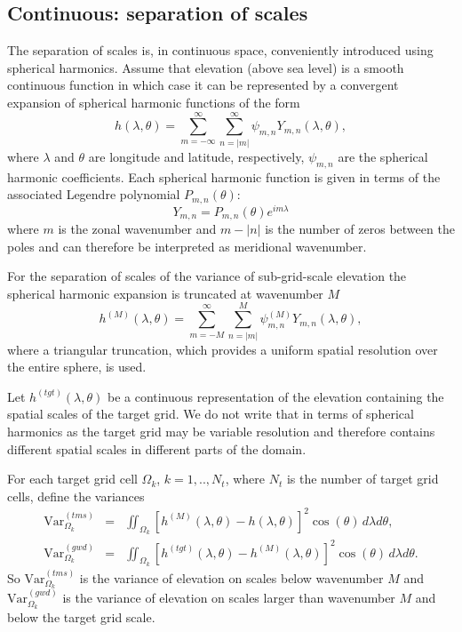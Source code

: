 \documentclass[gmd]{copernicus}
\begin{document}
\subsection{Continuous: separation of scales}
The separation of scales is, in continuous space, conveniently introduced using spherical harmonics. Assume that elevation (above sea level) is a smooth continuous function in which case it can be represented by a convergent expansion of spherical harmonic functions of the form
%
%
\begin{equation}
h(\lambda,\theta)=\sum_{m=-\infty}^\infty \sum_{n=|m|}^\infty \psi_{m,n}Y_{m,n}(\lambda,\theta),
\end{equation}
\citep[e.g.,][]{Durran} where $\lambda$ and $\theta$ are longitude and latitude, respectively, $\psi_{m,n}$ are the spherical harmonic coefficients. Each spherical harmonic function is given in terms of the associated Legendre polynomial $P_{m,n}(\theta)$:
\begin{equation}
 Y_{m,n}=P_{m,n}(\theta)e^{im\lambda}
\end{equation}
where $m$ is the zonal wavenumber and $m-|n|$ is the number of zeros between the poles and can therefore be interpreted as meridional wavenumber. 

For the separation of scales of the variance of sub-grid-scale elevation the spherical harmonic expansion is truncated at wavenumber $M$
\begin{equation}
h^{(M)}(\lambda,\theta)=\sum_{m=-M}^\infty \sum_{n=|m|}^{M} \psi^{(M)}_{m,n}Y_{m,n}(\lambda,\theta),
\end{equation}
where a triangular truncation, which provides a uniform spatial resolution over the entire sphere, is used. 

Let $h^{(tgt)}(\lambda,\theta)$ be a continuous representation of the elevation containing the spatial scales of the target grid. We do not write that in terms of spherical harmonics as the target grid may be variable resolution and therefore contains different spatial scales in different parts of the domain.

For each target grid cell $\Omega_k$, $k=1, ..,N_t$, where $N_t$ is the number of target grid cells, define the variances
\begin{eqnarray}
\text{Var}^{(tms)}_{\Omega_k}&=&\iint_{\Omega_k}\left[ h^{(M)}(\lambda,\theta)-h(\lambda,\theta)\right]^2\cos(\theta)\, d\lambda d\theta, \\
\text{Var}^{(gwd)}_{\Omega_k}&=&\iint_{\Omega_k}\left[ h^{(tgt)}(\lambda,\theta)-h^{(M)}(\lambda,\theta)\right]^2\cos(\theta)\, d\lambda d\theta.
\end{eqnarray}
So $\text{Var}^{(tms)}_{\Omega_k}$ is the variance of elevation on scales below wavenumber $M$ and $\text{Var}^{(gwd)}_{\Omega_k}$ is the variance of elevation on scales larger than wavenumber $M$ and below the target grid scale.
\end{document}
